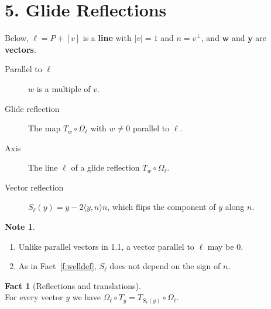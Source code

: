 \documentclass[11pt,a4paper]{article}
\theoremstyle{boxed}
\theoremstyle{definition}
\newtheorem{fact}{Fact}
\newtheorem*{note}{Note}
\newenvironment{plate}{\par\medskip\noindent\begin{minipage}{\linewidth}\centering}{\end{minipage}\par\medskip}
\newcommand{\ip}[2]{\langle #1, #2 \rangle}
\newcommand{\abs}[1]{\lvert #1 \rvert}
\begin{document}
\begin{plate}
\label{fig:three-mirrors}
\end{plate}

\newpage
\section*{5. Glide Reflections}

Below, $\boldsymbol{\ell}=P+[v]$ is a \textbf{line} with $\abs{v}=1$ and $n=v^\perp$, and $\boldsymbol{w}$ and $\boldsymbol{y}$ are \textbf{vectors}.
\begin{description}
    \item[Parallel to $\boldsymbol{\ell}$] $w$ is a multiple of $v$.
    \item[Glide reflection] The map $T_w\circ\Omega_\ell$ with $w\neq0$ parallel to $\ell$.
    \item[Axis] The line $\ell$ of a glide reflection $T_w\circ\Omega_\ell$.
    \item[Vector reflection] $S_\ell(y)=y-2\ip{y}{n}n$, which flips the component of $y$ along $n$.
\end{description}

\begin{note}
\leavevmode
\begin{enumerate}[label=\arabic*.]
    \item Unlike parallel vectors in 1.1, a vector parallel to $\ell$ may be $0$.
    \item As in Fact~\ref{f:welldef}, $S_\ell$ does not depend on the sign of $n$.
\end{enumerate}
\end{note}

\begin{fact}[Reflections and translations]\label{f:slide}
\leavevmode\\
For every vector $y$ we have $\Omega_\ell\circ T_y=T_{S_\ell(y)}\circ\Omega_\ell$.
\end{fact}
\end{document}
